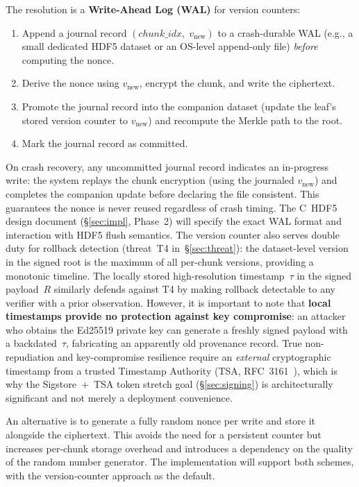\documentclass[11pt]{article}
\begin{document}
The resolution is a \textbf{Write-Ahead Log (WAL)} for version counters:
\begin{enumerate}[nosep]
  \item Append a journal record $(\mathit{chunk\_idx},\; v_\text{new})$ to a
    crash-durable WAL (e.g., a small dedicated HDF5 dataset or an OS-level
    append-only file) \emph{before} computing the nonce.
  \item Derive the nonce using $v_\text{new}$, encrypt the chunk, and write
    the ciphertext.
  \item Promote the journal record into the companion dataset (update the
    leaf's stored version counter to $v_\text{new}$) and recompute the
    Merkle path to the root.
  \item Mark the journal record as committed.
\end{enumerate}
On crash recovery, any uncommitted journal record indicates an in-progress
write: the system replays the chunk encryption (using the journaled
$v_\text{new}$) and completes the companion update before declaring the
file consistent. This guarantees the nonce is never reused regardless of
crash timing. The C~HDF5 design document (\S\ref{sec:impl}, Phase~2)
will specify the exact WAL format and interaction with HDF5 flush semantics. The version counter also serves double duty
for rollback detection (threat~T4 in~\S\ref{sec:threat}): the dataset-level
version in the signed root is the maximum of all per-chunk versions, providing
a monotonic timeline. The locally stored high-resolution timestamp~$\tau$
in the signed payload~$R$ similarly defends against T4 by making rollback
detectable to any verifier with a prior observation. However, it is important
to note that \textbf{local timestamps provide no protection against key
compromise}: an attacker who obtains the Ed25519 private key can generate a
freshly signed payload with a backdated~$\tau$, fabricating an apparently old
provenance record. True non-repudiation and key-compromise resilience require
an \emph{external} cryptographic timestamp from a trusted Timestamp Authority
(TSA, RFC~3161~\cite{rfc3161}), which is why the Sigstore~$+$~TSA token
stretch goal (\S\ref{sec:signing}) is architecturally significant and not
merely a deployment convenience.

An alternative is to generate a fully random nonce per write and store it
alongside the ciphertext. This avoids the need for a persistent counter but
increases per-chunk storage overhead and introduces a dependency on the quality
of the random number generator. The implementation will support both schemes,
with the version-counter approach as the default.
\end{document}
